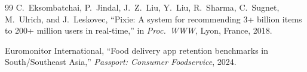 \documentclass[conference]{IEEEtran}
\begin{document}
\begin{thebibliography}{99}
C.\ Eksombatchai, P.\ Jindal, J.\ Z.\ Liu, Y.\ Liu, R.\ Sharma,
C.\ Sugnet, M.\ Ulrich, and J.\ Leskovec, ``Pixie: A system for
recommending 3+ billion items to 200+ million users in real-time,''
in \textit{Proc.\ WWW}, Lyon, France, 2018.

Euromonitor International, ``Food delivery app retention benchmarks in
South/Southeast Asia,'' \textit{Passport: Consumer Foodservice}, 2024.

\end{thebibliography}
\end{document}

